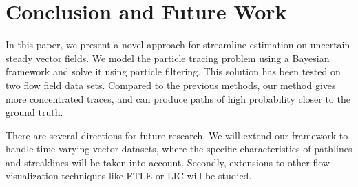 \section{Conclusion and Future Work}

In this paper, we present a novel approach for streamline estimation on uncertain steady vector fields. We model the particle tracing problem using a Bayesian framework and solve it using particle filtering. This solution has been tested on two flow field data sets. Compared to the previous methods, our method gives more concentrated traces, and can produce paths of high probability closer to the ground truth.

There are several directions for future research. We will extend our framework to handle time-varying vector datasets, where the specific characteristics of pathlines and streaklines will be taken into account. Secondly, extensions to other flow visualization techniques like FTLE or LIC will be studied.
